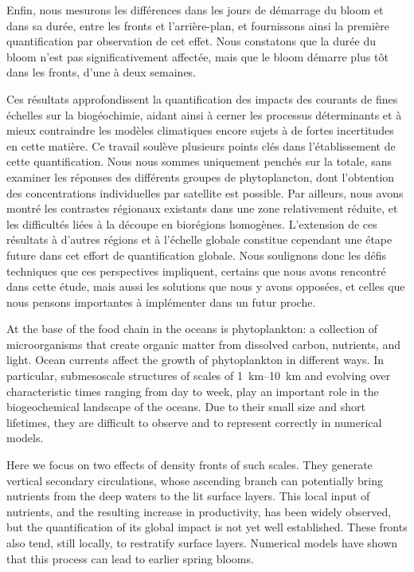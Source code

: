 Enfin, nous mesurons les différences dans les jours de démarrage du bloom et dans sa durée, entre les fronts et l'arrière-plan, et fournissons ainsi la première quantification par observation de cet effet.
Nous constatons que la durée du bloom n'est pas significativement affectée, mais que le bloom démarre plus tôt dans les fronts, d'une à deux semaines.

Ces résultats approfondissent la quantification des impacts des courants de fines échelles sur la biogéochimie, aidant ainsi à cerner les processus déterminants et à mieux contraindre les modèles climatiques encore sujets à de fortes incertitudes en cette matière.
Ce travail soulève plusieurs points clés dans l'établissement de cette quantification.
Nous nous sommes uniquement penchés sur la  totale, sans examiner les réponses des différents groupes de phytoplancton, dont l'obtention des concentrations individuelles par satellite est possible.
Par ailleurs, nous avons montré les contrastes régionaux existants dans une zone relativement réduite, et les difficultés liées à la découpe en biorégions homogènes.
L'extension de ces résultats à d'autres régions et à l'échelle globale constitue cependant une étape future dans cet effort de quantification globale.
Nous soulignons donc les défis techniques que ces perspectives impliquent, certains que nous avons rencontré dans cette étude, mais aussi les solutions que nous y avons opposées, et celles que nous pensons importantes à implémenter dans un futur proche.


At the base of the food chain in the oceans is phytoplankton: a collection of microorganisms that create organic matter from dissolved carbon, nutrients, and light.
Ocean currents affect the growth of phytoplankton in different ways.
In particular, submesoscale structures of scales of \qtyrange{1}{10}{\km} and evolving over characteristic times ranging from day to week, play an important role in the biogeochemical landscape of the oceans.
Due to their small size and short lifetimes, they are difficult to observe  and to represent correctly in numerical models.

Here we focus on two effects of density fronts of such scales.
They generate vertical secondary circulations, whose ascending branch can potentially bring nutrients from the deep waters to the lit surface layers.
This local input of nutrients, and the resulting increase in productivity, has been widely observed, but the quantification of its global impact is not yet well established.
These fronts also tend, still locally, to restratify surface layers.
Numerical models have shown that this process can lead to earlier spring blooms.

